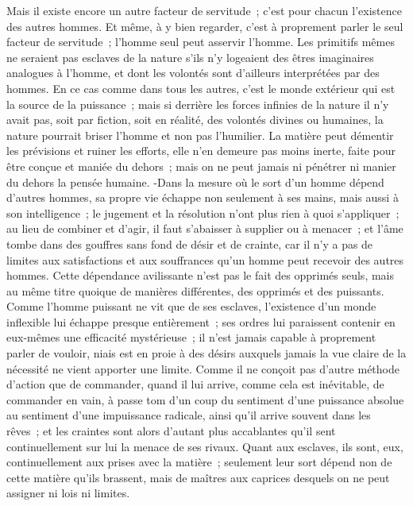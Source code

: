 \documentclass[french,twoside]{book} %
\begin{document}
Mais il existe encore un autre facteur de servitude ; c'est pour chacun l'existence des autres hommes. Et même, à y bien regarder, c'est à proprement parler le seul facteur de servitude ; l'homme seul peut asservir l'homme. Les primitifs mêmes ne seraient pas esclaves de la nature s'ils n'y logeaient des êtres imaginaires analogues à l'homme, et dont les volontés sont d'ailleurs interprétées par des hommes. En ce cas comme dans tous les autres, c'est le monde extérieur qui est la source de la puissance ; mais si derrière les forces infinies de la nature il n'y avait pas, soit par fiction, soit en réalité, des volontés divines ou humaines, la nature pourrait briser l'homme et non pas l'humilier. La matière peut démentir les prévisions et ruiner les efforts, elle n'en demeure pas moins inerte, faite pour être conçue et maniée du dehors ; mais on ne peut jamais ni pénétrer ni manier du dehors la pensée humaine. -Dans la mesure où le sort d'un homme dépend d'autres hommes, sa propre vie échappe non seulement à ses mains, mais aussi à son intelligence ; le jugement et la résolution n'ont plus rien à quoi s'appliquer ; au lieu de combiner et d'agir, il faut s'abaisser à supplier ou à menacer ; et l'âme tombe dans des gouffres sans fond de désir et de crainte, car il n'y a pas de limites aux satisfactions et aux souffrances qu'un homme peut recevoir des autres hommes. Cette dépendance avilissante n'est pas le fait des opprimés seuls, mais au même titre quoique de manières différentes, des opprimés et des puissants. Comme l'homme puissant ne vit que de ses esclaves, l'existence d'un monde inflexible lui échappe presque entièrement ; ses ordres lui paraissent contenir en eux-mêmes une efficacité mystérieuse ; il n'est jamais capable à proprement parler de vouloir, niais est en proie à des désirs auxquels jamais la vue claire de la nécessité ne vient apporter une limite. Comme il ne conçoit pas d'autre méthode d'action que de commander, quand il lui arrive, comme cela est inévitable, de commander en vain, à passe tom d'un coup du sentiment d'une puissance absolue au sentiment d'une impuissance radicale, ainsi qu'il arrive souvent dans les rêves ; et les craintes sont alors d'autant plus accablantes qu'il sent continuellement sur lui la menace de ses rivaux. Quant aux esclaves, ils sont, eux, continuellement aux prises avec la matière ; seulement leur sort dépend non de cette matière qu'ils brassent, mais de maîtres aux caprices desquels on ne peut assigner ni lois ni limites.\par
\end{document}
